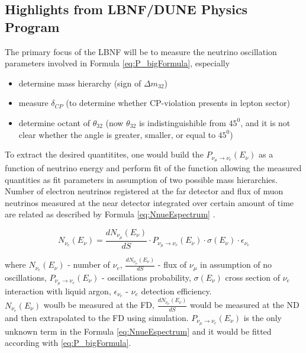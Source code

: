 \subsection{Highlights from LBNF/DUNE Physics Program}

The primary focus of the LBNF will be to measure the neutrino oscillation parameters involved in Formula \ref{eq:P_bigFormula}, especially 
\begin{itemize}
\item determine mass hierarchy (sign of $\Delta{m_{32}}$)
\item measure $\delta_{CP}$ (to determine whether CP-violation presents in lepton sector)
\item determine octant of $\theta_{32}$ (now $\theta_{32}$ is indistinguishible from $45^0$, and it is not clear whether the angle is greater, smaller, or equal to $45^0$)
\end{itemize}

To extract the desired quantitites, one would build the $P_{\nu_\mu \rightarrow \nu_e}(E_{\nu})$ as a function of neutrino energy and perform fit of the function allowing the measured quantities as fit parameters in assumption of two possible mass hierarchies. Number of electron neutrinos registered at the far detector and flux of muon neutrinos measured at the near detector integrated over certain amount of time are related as described by Formula \ref{eq:NnueEspectrum} \cite{ref_LisaWhitehead}. \\

\begin{center}
\begin{equation}
\label{eq:NnueEspectrum}
N_{\nu_e}(E_{\nu}) = \frac{dN_{\nu_\mu}(E_{\nu})}{dS} \cdot P_{\nu_\mu \rightarrow \nu_e}(E_{\nu}) \cdot \sigma(E_{\nu}) \cdot \epsilon_{\nu_e} 
\end{equation}
\end{center}
where $N_{\nu_e}(E_{\nu})$ - number of $\nu_e$, $\frac{dN_{\nu_\mu}(E_{\nu})}{dS}$ - flux of $\nu_\mu$ in assumption of no oscillations, $P_{\nu_\mu \rightarrow \nu_e}(E_{\nu})$ - oscillations probability, $\sigma(E_{\nu})$ cross section of $\nu_e$ interaction with liquid argon, $\epsilon_{\nu_e}$ - $\nu_e$ detection efficiency.\\

$N_{\nu_e}(E_{\nu})$ woulb be measured at the FD, $\frac{dN_{\nu_\mu}(E_{\nu})}{dS}$ would be measured at the ND and then extrapolated to the FD using simulation. $P_{\nu_\mu \rightarrow \nu_e}(E_{\nu})$ is the only unknown term in the Formula \ref{eq:NnueEspectrum} and it would be fitted according with \ref{eq:P_bigFormula}.

